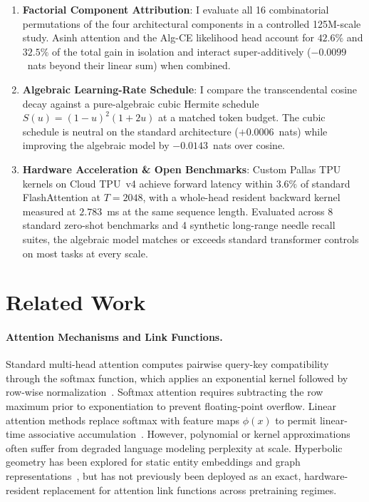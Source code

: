 \documentclass[11pt,a4paper]{article}
\theoremstyle{definition}
\begin{document}
\begin{enumerate}
    \item \textbf{Factorial Component Attribution}: I evaluate all 16 combinatorial permutations of the four architectural components in a controlled 125M-scale study. Asinh attention and the Alg-CE likelihood head account for $42.6\%$ and $32.5\%$ of the total gain in isolation and interact super-additively ($-0.0099$~nats beyond their linear sum) when combined.
    \item \textbf{Algebraic Learning-Rate Schedule}: I compare the transcendental cosine decay against a pure-algebraic cubic Hermite schedule $S(u) = (1-u)^2(1+2u)$ at a matched token budget. The cubic schedule is neutral on the standard architecture ($+0.0006$~nats) while improving the algebraic model by $-0.0143$~nats over cosine.
    \item \textbf{Hardware Acceleration \& Open Benchmarks}: Custom Pallas TPU kernels on Cloud TPU~v4 achieve forward latency within $3.6\%$ of standard FlashAttention at $T=2048$, with a whole-head resident backward kernel measured at $2.783$~ms at the same sequence length. Evaluated across 8 standard zero-shot benchmarks and 4 synthetic long-range needle recall suites, the algebraic model matches or exceeds standard transformer controls on most tasks at every scale.
\end{enumerate}

\section{Related Work}
\label{sec:related}

\paragraph{Attention Mechanisms and Link Functions.}
Standard multi-head attention computes pairwise query-key compatibility through the softmax function, which applies an exponential kernel followed by row-wise normalization~\citep{vaswani2017attention,dao2022flashattention}. Softmax attention requires subtracting the row maximum prior to exponentiation to prevent floating-point overflow. Linear attention methods replace softmax with feature maps $\phi(x)$ to permit linear-time associative accumulation~\citep{mathieu2019continuous}. However, polynomial or kernel approximations often suffer from degraded language modeling perplexity at scale. Hyperbolic geometry has been explored for static entity embeddings and graph representations~\citep{nickel2017poincare,ganea2018hyperbolic,chami2019hyperbolic,ungar2001hyperbolic}, but has not previously been deployed as an exact, hardware-resident replacement for attention link functions across pretraining regimes.
\end{document}
